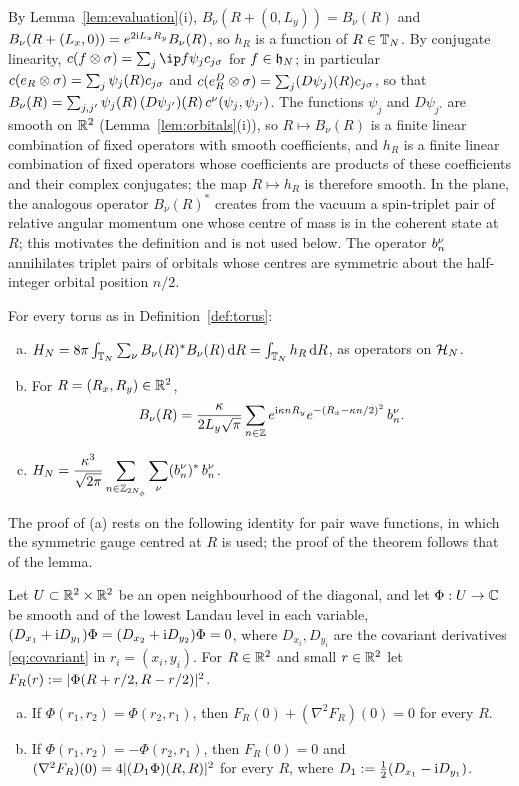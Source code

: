 By Lemma~\ref{lem:evaluation}(i), $B_\nu(R+(0,L_y))=B_\nu(R)$ and $B_\nu(R+(L_x,0))=e^{2\mathrm{i} L_xR_y}B_\nu(R)$, so
$h_R$ is a function of $R\in\mathbb{T}_N$. By conjugate linearity, $c(f\otimes\sigma)=\sum_j\ip f{\psi_j}c_{j\sigma}$ for
$f\in\mathfrak{h}_N$; in particular $c(e_{R}\otimes\sigma)=\sum_j\psi_j(R)c_{j\sigma}$ and $c(e^{D}_{R}\otimes\sigma)=\sum_j(D\psi_j)(R)c_{j\sigma}$,
so that $B_\nu(R)=\sum_{j,j'}\psi_j(R)\,(D\psi_{j'})(R)\,c^{\nu}(\psi_j,\psi_{j'})$. The functions $\psi_j$ and $D\psi_{j'}$
are smooth on $\mathbb{R}^2$ (Lemma~\ref{lem:orbitals}(i)), so $R\mapsto B_\nu(R)$ is a finite linear combination of fixed
operators with smooth coefficients, and $h_R$ is a finite linear combination of fixed operators whose coefficients
are products of these coefficients and their complex conjugates; the map $R\mapsto h_R$ is therefore smooth. In the
plane, the analogous operator $B_\nu(R)^*$ creates from the vacuum a spin-triplet pair of relative angular
momentum one whose centre of mass is in the coherent state at $R$; this motivates the definition and is not
used below. The operator $b^{\nu}_{n}$ annihilates triplet pairs of orbitals whose centres are symmetric about
the half-integer orbital position $n/2$.

\begin{theorem}\label{thm:localform}
For every torus as in Definition~\ref{def:torus}:
\begin{enumerate}[(a)]
\item $H_N=8\pi\int_{\mathbb{T}_N}\sum_\nu B_\nu(R)^*B_\nu(R)\,\mathrm{d} R=\int_{\mathbb{T}_N}h_R\,\mathrm{d} R$, as operators on $\mathcal{H}_N$.
\item For $R=(R_x,R_y)\in\mathbb{R}^2$,
\[
B_\nu(R)=\frac{\kappa}{2L_y\sqrt\pi}\sum_{n\in\mathbb{Z}}e^{\mathrm{i}\kappa nR_y}e^{-(R_x-\kappa n/2)^2}\,b^{\nu}_{n} .
\]
\item $H_N=\dfrac{\kappa^3}{\sqrt{2\pi}}\displaystyle\sum_{n\in\mathbb{Z}_{2N_{\phi}}}\sum_\nu(b^{\nu}_{n})^*\,b^{\nu}_{n}$.
\end{enumerate}
\end{theorem}

The proof of (a) rests on the following identity for pair wave functions, in which the symmetric gauge
centred at $R$ is used; the proof of the theorem follows that of the lemma.

\begin{lemma}\label{lem:jets}
Let $U\subset\mathbb{R}^2\times\mathbb{R}^2$ be an open neighbourhood of the diagonal, and let $\Phi:U\to\mathbb{C}$ be smooth and of
the lowest Landau level in each variable, $(D_{x_1}+\mathrm{i} D_{y_1})\Phi=(D_{x_2}+\mathrm{i} D_{y_2})\Phi=0$, where
$D_{x_i},D_{y_i}$ are the covariant derivatives \eqref{eq:covariant} in $r_i=(x_i,y_i)$. For $R\in\mathbb{R}^2$ and small
$r\in\mathbb{R}^2$ let $F_R(r):=\lvert\Phi(R+r/2,R-r/2)\rvert^2$.
\begin{enumerate}[(a)]
\item If $\Phi(r_1,r_2)=\Phi(r_2,r_1)$, then $F_R(0)+(\nabla^2F_R)(0)=0$ for every $R$.
\item If $\Phi(r_1,r_2)=-\Phi(r_2,r_1)$, then $F_R(0)=0$ and $(\nabla^2F_R)(0)=4\lvert(D_1\Phi)(R,R)\rvert^2$ for every
$R$, where $D_1:=\frac12(D_{x_1}-\mathrm{i} D_{y_1})$.
\end{enumerate}
\end{lemma}

